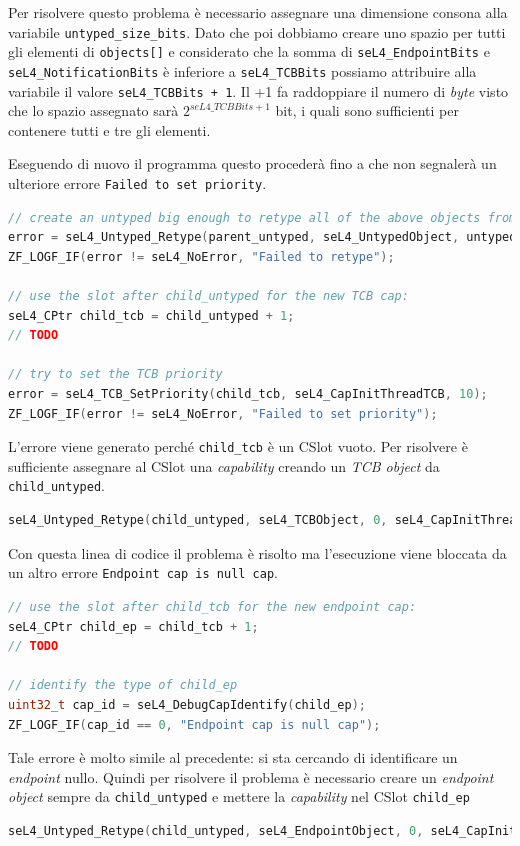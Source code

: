 Per risolvere questo problema è necessario assegnare una dimensione consona alla variabile \texttt{untyped\_size\_bits}. Dato che poi dobbiamo creare uno spazio per tutti gli elementi di \texttt{objects[]} e considerato che la somma di \texttt{seL4\_EndpointBits} e \texttt{seL4\_NotificationBits} è inferiore a \texttt{seL4\_TCBBits} possiamo attribuire alla variabile il valore \texttt{seL4\_TCBBits + 1}. Il +1 fa raddoppiare il numero di \textit{byte} visto che lo spazio assegnato sarà $ 2^{seL4\_TCBBits + 1} $ bit, i quali sono sufficienti per contenere tutti e tre gli elementi.

Eseguendo di nuovo il programma questo procederà fino a che non segnalerà un ulteriore errore \texttt{Failed to set priority}.
\begin{lstlisting}[language=C++]
// create an untyped big enough to retype all of the above objects from
error = seL4_Untyped_Retype(parent_untyped, seL4_UntypedObject, untyped_size_bits, seL4_CapInitThreadCNode, 0, 0, child_untyped, 1);
ZF_LOGF_IF(error != seL4_NoError, "Failed to retype");

// use the slot after child_untyped for the new TCB cap:
seL4_CPtr child_tcb = child_untyped + 1;
// TODO

// try to set the TCB priority
error = seL4_TCB_SetPriority(child_tcb, seL4_CapInitThreadTCB, 10);
ZF_LOGF_IF(error != seL4_NoError, "Failed to set priority");
\end{lstlisting}

L'errore viene generato perché \texttt{child\_tcb} è un CSlot vuoto. Per risolvere è sufficiente assegnare al CSlot una \textit{capability} creando un \textit{TCB object} da \texttt{child\_untyped}.
\begin{lstlisting}[language=C++]
seL4_Untyped_Retype(child_untyped, seL4_TCBObject, 0, seL4_CapInitThreadCNode, 0, 0, child_tcb, 1);
\end{lstlisting}

Con questa linea di codice il problema è risolto ma l'esecuzione viene bloccata da un altro errore \texttt{Endpoint cap is null cap}.
\begin{lstlisting}[language=C++]
// use the slot after child_tcb for the new endpoint cap:
seL4_CPtr child_ep = child_tcb + 1;
// TODO

// identify the type of child_ep
uint32_t cap_id = seL4_DebugCapIdentify(child_ep);
ZF_LOGF_IF(cap_id == 0, "Endpoint cap is null cap");
\end{lstlisting}

Tale errore è molto simile al precedente: si sta cercando di identificare un \textit{endpoint} nullo. Quindi per risolvere il problema è necessario creare un \textit{endpoint object} sempre da \texttt{child\_untyped} e mettere la \textit{capability} nel CSlot \texttt{child\_ep}
\begin{lstlisting}[language=C++]
seL4_Untyped_Retype(child_untyped, seL4_EndpointObject, 0, seL4_CapInitThreadCNode, 0, 0, child_ep, 1);
\end{lstlisting}

